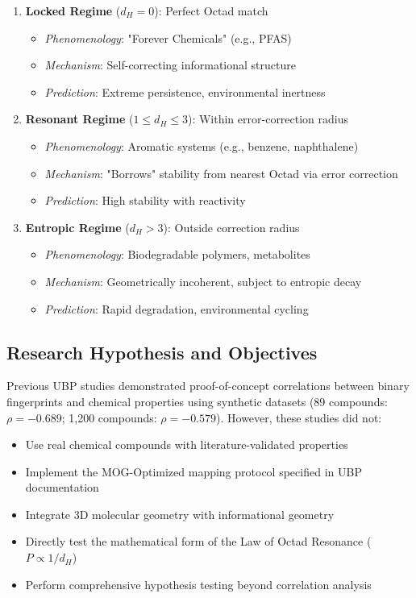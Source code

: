\documentclass[11pt,letterpaper]{article}
\begin{document}
\begin{enumerate}
    \item \textbf{Locked Regime} ($d_H = 0$): Perfect Octad match
    \begin{itemize}
        \item \textit{Phenomenology}: "Forever Chemicals" (e.g., PFAS)
        \item \textit{Mechanism}: Self-correcting informational structure
        \item \textit{Prediction}: Extreme persistence, environmental inertness
    \end{itemize}

    \item \textbf{Resonant Regime} ($1 \leq d_H \leq 3$): Within error-correction radius
    \begin{itemize}
        \item \textit{Phenomenology}: Aromatic systems (e.g., benzene, naphthalene)
        \item \textit{Mechanism}: "Borrows" stability from nearest Octad via error correction
        \item \textit{Prediction}: High stability with reactivity
    \end{itemize}

    \item \textbf{Entropic Regime} ($d_H > 3$): Outside correction radius
    \begin{itemize}
        \item \textit{Phenomenology}: Biodegradable polymers, metabolites
        \item \textit{Mechanism}: Geometrically incoherent, subject to entropic decay
        \item \textit{Prediction}: Rapid degradation, environmental cycling
    \end{itemize}
\end{enumerate}

\subsection{Research Hypothesis and Objectives}

Previous UBP studies demonstrated proof-of-concept correlations between binary fingerprints and chemical properties using synthetic datasets (89 compounds: $\rho = -0.689$; 1,200 compounds: $\rho = -0.579$). However, these studies did not:
\begin{itemize}
    \item Use real chemical compounds with literature-validated properties
    \item Implement the MOG-Optimized mapping protocol specified in UBP documentation
    \item Integrate 3D molecular geometry with informational geometry
    \item Directly test the mathematical form of the Law of Octad Resonance ($P \propto 1/d_H$)
    \item Perform comprehensive hypothesis testing beyond correlation analysis
\end{itemize}
\end{document}

